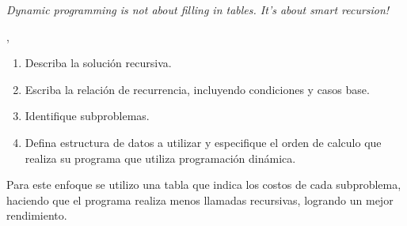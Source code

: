 
\epigraph{\textit{Dynamic programming is not about filling in tables. It's about smart recursion!}}{\citeauthor{algorithms_erickson}, \citeyear{algorithms_erickson} \cite{algorithms_erickson}}

\begin{enumerate}[1]
    \item Describa la solución recursiva.
    \item Escriba la relación de recurrencia, incluyendo condiciones y casos base.
    \item Identifique subproblemas.
    \item Defina estructura de datos a utilizar y especifique el orden de calculo que realiza su programa que utiliza programación dinámica. 
\end{enumerate}

Para este enfoque se utilizo una tabla que indica los costos de cada subproblema, haciendo que el programa realiza menos llamadas recursivas, logrando un mejor rendimiento.


